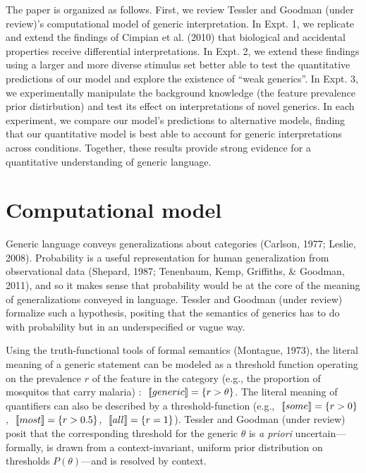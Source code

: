 \documentclass[floatsintext,doc]{apa6}
\theoremstyle{definition}
\theoremstyle{definition}
\theoremstyle{definition}
\theoremstyle{remark}
\begin{document}
The paper is organized as follows. First, we review Tessler and Goodman
(under review)'s computational model of generic interpretation. In Expt.
1, we replicate and extend the findings of Cimpian et al. (2010) that
biological and accidental properties receive differential
interpretations. In Expt. 2, we extend these findings using a larger and
more diverse stimulus set better able to test the quantitative
predictions of our model and explore the existence of \enquote{weak
generics}. In Expt. 3, we experimentally manipulate the background
knowledge (the feature prevalence prior distirbution) and test its effect on interpretations
of novel generics. In each experiment, we compare our model's
predictions to alternative models,  finding that our quantitative model
is best able to account for generic interpretations across conditions.
Together, these results provide strong evidence for a quantitative
understanding of generic language. 

\section{Computational model}\label{computational-model}

Generic language conveys generalizations about categories (Carlson,
1977; Leslie, 2008). Probability is a useful representation for human
generalization from observational data (Shepard, 1987; Tenenbaum, Kemp,
Griffiths, \& Goodman, 2011), and so it makes sense that probability
would be at the core of the meaning of generalizations conveyed in language.
Tessler and Goodman (under review) formalize such a hypothesis, positing
that the semantics of generics has to do with probability but in an
underspecified or vague way.

Using the truth-functional tools of formal semantics (Montague, 1973),
the literal meaning of a generic statement can be modeled as a threshold
function operating on the prevalence \(r\) of the feature in the
category (e.g., the proportion of mosquitos that carry malaria) :
\(\mbox{ $[\![ generic ]\!]$} = \{r > \theta\}\). The literal meaning of
quantifiers can also be described by a threshold-function (e.g.,
\(\mbox{ $[\![ some ]\!]$} = \{r > 0\}\), \(\mbox{ $[\![ most ]\!]$} = \{r > 0.5\}\),
\(\mbox{ $[\![ all ]\!]$} = \{r = 1\}\)). Tessler and Goodman (under review) posit
that the corresponding threshold for the generic \(\theta\) is \emph{a
priori} uncertain---formally, is drawn from a context-invariant, uniform
prior distribution on thresholds \(P(\theta)\)---and is resolved by
context.
\end{document}
